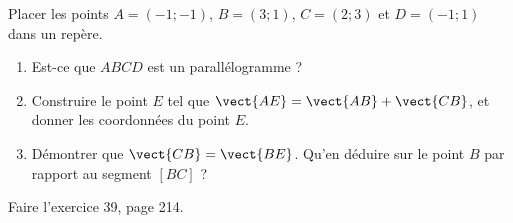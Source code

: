 
\begin{exercice}\label{exosmath-0591}

    Placer les points \( A=(-1;-1)\), \( B=(3;1)\), \( C=(2;3)\) et \( D=(-1;1)\) dans un repère.
    \begin{enumerate}
        \item
            Est-ce que \( ABCD\) est un parallélogramme ?
        \item
            Construire le point \( E\) tel que \( \vect{ AE }=\vect{ AB }+\vect{ CB }\), et donner les coordonnées du point \( E\).
        \item
            Démontrer que \( \vect{ CB }=\vect{ BE } \). Qu'en déduire sur le point \( B\) par rapport au segment \( [BC]\) ?
    \end{enumerate}

    Faire l'exercice 39, page 214.

\end{exercice}
